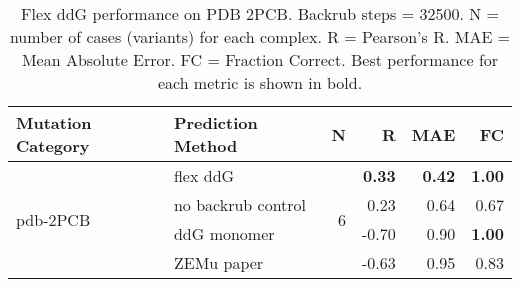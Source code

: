 \begin{table}
  \begin{tabular}{llrrrr}
\toprule
Mutation Category &   Prediction Method &  N &     R &  MAE &   FC \\
\midrule
 \multirow{ 4}{*}{pdb-2PCB} & flex ddG & \multirow{ 4}{*}{6} & \textbf{0.33} & \textbf{0.42} & \textbf{1.00}  \\
 & no backrub control & & 0.23 & 0.64 & 0.67  \\
 & ddG monomer & & -0.70 & 0.90 & \textbf{1.00}  \\
 & ZEMu paper & & -0.63 & 0.95 & 0.83  \\
\bottomrule
\end{tabular}
  \caption[Flex ddG performance on PDB 2PCB]{
    Flex ddG performance on PDB 2PCB. Backrub steps = 32500. N = number of cases (variants) for each complex. R = Pearson's R. MAE = Mean Absolute Error. FC = Fraction Correct. Best performance for each metric is shown in bold.
  } \label{tab:table-pdb-2PCB}
\end{table}
